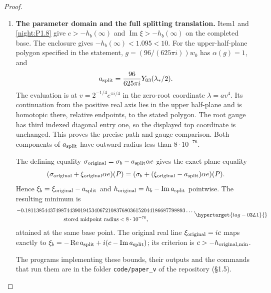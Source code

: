 \begin{proof}
\begin{enumerate}[label={$\langle1\rangle$\arabic*.}]
These maps also prove the cusp limit.  The lower block of $e_J$
is zero, so $L$ is independent of a real parameter $c$, and
$C_c$ is holomorphic at zero and affine in $c$.
For every fixed real $M$, it is uniformly bounded on a smaller
closed disc and the compact interval between $c_*$ and $-M$.
As $y\to\infty$, the Neumann inverse makes
$yI+\operatorname{Im}C_c$ invertible uniformly on that interval.
The real quantity $h_b+c$ cannot cross zero along it; its sign
at $c_*$ is positive, so $h_b-M>0$ at the other endpoint.
Thus $h_b\to+\infty$ at the cusp. The closed covers and the
central strict estimate prove the global minimum and uniqueness.

\item \textbf{The parameter domain and the full splitting translation.}
Item1 and \cref{night:P1.8} give
$c>-h_b(\infty)$ and $\operatorname{Im}\xi>-h_b(\infty)$
on the completed base. The enclosure gives
$-h_b(\infty)<1.095<10$.
For the upper-half-plane polygon specified in the statement,
$g=(96/(625\pi i))w_0$ has $\alpha(g)=1$, and
\[
 a_{\rm split}=\frac{96}{625\pi i}Y_{03}(\lambda_*/2).
\]
The evaluation is at
$v=2^{-1/4}e^{\pi i/4}$ in the zero-root coordinate
$\lambda=av^4$.  Its continuation from the positive real axis
lies in the upper half-plane and is homotopic there, relative
endpoints, to the stated polygon. The root gauge has third
indexed diagonal entry one, so the displayed top coordinate is
unchanged. This proves the precise path and gauge comparison.
Both components of $a_{\rm split}$ have outward radius less than
$8\cdot10^{-76}$.

The defining equality
$\sigma_{\rm original}=\sigma_b-a_{\rm split}\alpha e$
gives the exact plane equality
\[
 (\sigma_{\rm original}+\xi_{\rm original}\alpha e)(P)
 =(\sigma_b+(\xi_{\rm original}-a_{\rm split})\alpha e)(P).
\]
Hence $\xi_b=\xi_{\rm original}-a_{\rm split}$ and
$h_{\rm original}=h_b-\operatorname{Im}a_{\rm split}$ pointwise.
The resulting minimum is
\[
 \begin{gathered}
 -0.1811385443749874439019453406721083768036152044186687798893\ldots,\\
 \text{stored midpoint radius}<8\cdot10^{-76},
 \end{gathered}\hypertarget{tag-03L1}{}\label{layout:V:fresh-splitting}
\]
attained at the same base point.
The original real line $\xi_{\rm original}=ic$ maps exactly to
$\xi_b=-\operatorname{Re}a_{\rm split}
       +i(c-\operatorname{Im}a_{\rm split})$;
its criterion is $c>-h_{{\rm original},\min}$.

The programs implementing these bounds, their outputs and the commands that run them are in the folder \texttt{code/paper\_v} of the repository (\S1.5).
\end{enumerate}
\end{proof}

